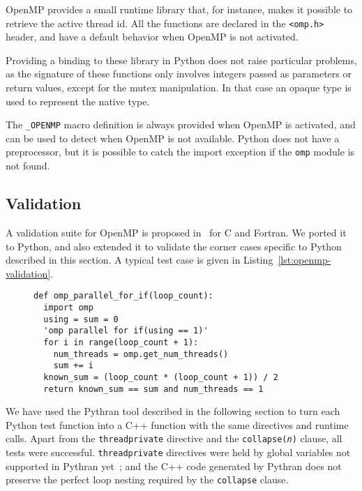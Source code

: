 \documentclass{llncs}
\begin{document}
OpenMP provides a small runtime library that, for instance, makes it possible to
retrieve the active thread id. All the functions are declared in the
\texttt{<omp.h>} header, and have a default behavior when OpenMP is not
activated.

Providing a binding to these library in Python does not raise particular
problems, as the signature of these functions only involves integers passed as
parameters or return values, except for the mutex manipulation. In that case an
opaque type is used to represent the native type.

The \texttt{\_OPENMP} macro definition is always provided when OpenMP is
activated, and can be used to detect when OpenMP is not available. Python does
not have a preprocessor, but it is possible to catch the import exception if the
\texttt{omp} module is not found.

\subsection{Validation}

A validation suite for OpenMP is proposed in~\cite{wang2012} for C and Fortran.
We ported it to Python, and also extended it to validate the corner cases
specific to Python described in this section. A typical test case is given in
Listing~\ref{lst:openmp-validation}.

\begin{figure}
    \begin{lstlisting}[label={lst:openmp-validation},caption={Example of Python
    OpenMP validation test case.}]
def omp_parallel_for_if(loop_count):
  import omp
  using = sum = 0
  'omp parallel for if(using == 1)'
  for i in range(loop_count + 1):
    num_threads = omp.get_num_threads()
    sum += i
  known_sum = (loop_count * (loop_count + 1)) / 2
  return known_sum == sum and num_threads == 1
    \end{lstlisting}
\end{figure}

We have used the Pythran tool described in the following section to turn each
Python test function into a C++ function with the same directives and runtime
calls. Apart from the \texttt{threadprivate} directive and the
\texttt{collapse(\emph{n})} clause, all tests were successful.
\texttt{threadprivate} directives were held by global variables not supported in
Pythran yet~; and the C++ code generated by Pythran does not preserve the perfect
loop nesting required by the \texttt{collapse} clause.
\end{document}

